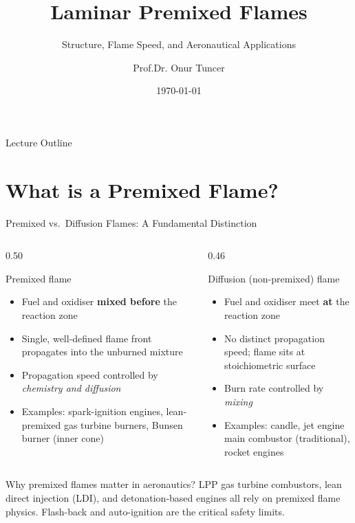 \documentclass[12pt,aspectratio=169]{beamer}
\title{Laminar Premixed Flames}
\subtitle{Structure, Flame Speed, and Aeronautical Applications}
\author{Prof.Dr. Onur Tuncer}
\institute{Istanbul Technical University}
\date{\today}
\begin{document}
\begin{frame}
  \titlepage
\end{frame}

\begin{frame}{Lecture Outline}
  \tableofcontents
\end{frame}

\section{What is a Premixed Flame?}

\begin{frame}{Premixed vs.\ Diffusion Flames: A Fundamental Distinction}

  \begin{columns}
    \begin{column}{0.50\textwidth}
      \begin{block}{Premixed flame}
        \begin{itemize}
          \item Fuel and oxidiser \textbf{mixed before} the reaction zone
          \item Single, well-defined flame front propagates into
                the unburned mixture
          \item Propagation speed controlled by
                \emph{chemistry and diffusion}
          \item Examples: spark-ignition engines, lean-premixed
                gas turbine burners, Bunsen burner (inner cone)
        \end{itemize}
      \end{block}
    \end{column}
    \begin{column}{0.46\textwidth}
      \begin{alertblock}{Diffusion (non-premixed) flame}
        \begin{itemize}
          \item Fuel and oxidiser meet \textbf{at} the reaction zone
          \item No distinct propagation speed; flame sits at
                stoichiometric surface
          \item Burn rate controlled by \emph{mixing}
          \item Examples: candle, jet engine main combustor
                (traditional), rocket engines
        \end{itemize}
      \end{alertblock}
    \end{column}
  \end{columns}

  \smallskip
  \begin{exampleblock}{Why premixed flames matter in aeronautics?}
    \small LPP gas turbine combustors, lean direct injection (LDI), and
    detonation-based engines all rely on premixed flame physics.
    Flash-back and auto-ignition are the critical safety limits.
  \end{exampleblock}
\end{frame}
\end{document}
